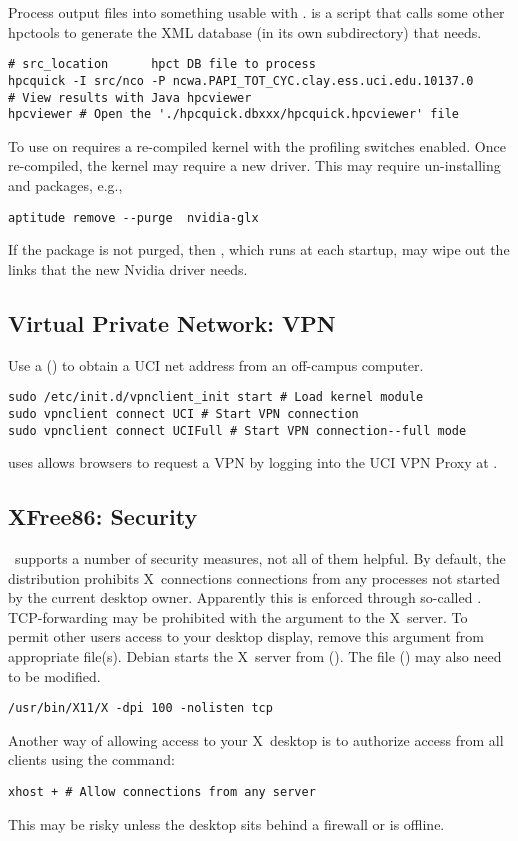 \documentclass[12pt,twoside]{article}
\begin{document}
Process  output files into something usable with
.  
 is a  script that calls some other
hpctools to generate the XML database (in its own subdirectory) that
 needs. 
\begin{verbatim}
# src_location      hpct DB file to process
hpcquick -I src/nco -P ncwa.PAPI_TOT_CYC.clay.ess.uci.edu.10137.0
# View results with Java hpcviewer
hpcviewer # Open the './hpcquick.dbxxx/hpcquick.hpcviewer' file
\end{verbatim}

To use  on  requires a re-compiled
kernel with the profiling switches enabled.
Once re-compiled, the kernel may require a new  driver.
This may require un-installing and  packages, e.g.,
\begin{verbatim}
aptitude remove --purge  nvidia-glx
\end{verbatim}
If the package is not purged, then ,
which runs at each startup, may wipe out the  links that
the new Nvidia driver needs. 

\subsection{Virtual Private Network: VPN}
Use a  () to
obtain a UCI net address from an off-campus computer.
\begin{verbatim}
sudo /etc/init.d/vpnclient_init start # Load kernel module
sudo vpnclient connect UCI # Start VPN connection
sudo vpnclient connect UCIFull # Start VPN connection--full mode
\end{verbatim}
 uses allows browsers to request a VPN by
logging into the UCI VPN Proxy at . 

\subsection{XFree86: Security}
~supports a number of security measures, not all of them
 helpful.
By default, the  distribution prohibits X~connections
connections from any processes not started by the current desktop
 owner. 
Apparently this is enforced through so-called .
TCP-forwarding may be prohibited with the 
 argument to the X~server.
To permit other users access to your desktop display, remove this
 argument from appropriate file(s).
Debian starts the X~server from 
().
The  file () may also need to
 be modified.
\begin{verbatim}
/usr/bin/X11/X -dpi 100 -nolisten tcp
\end{verbatim}
Another way of allowing access to your X~desktop is to authorize
access from all clients using the  command:
\begin{verbatim}
xhost + # Allow connections from any server
\end{verbatim}
This may be risky unless the desktop sits behind a firewall or is
offline.
\end{document}
